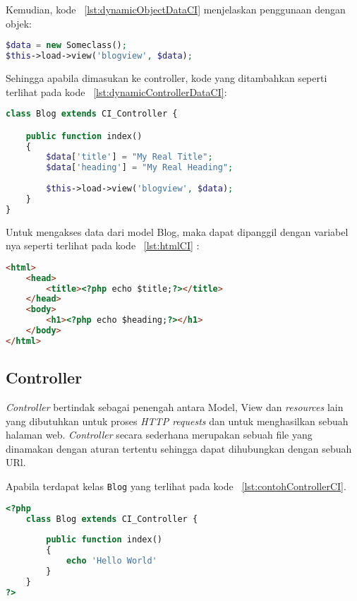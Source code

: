 \noindent Kemudian, kode ~\ref{lst:dynamicObjectDataCI} menjelaskan penggunaan dengan objek:
\begin{lstlisting}[style=customphp, language=PHP, basicstyle=\ttfamily, frame=single, columns=fullflexible, keepspaces=true, breaklines=true, showstringspaces=false, label={lst:dynamicObjectDataCI}, caption=Struktur data dinamis berbentuk objek.] 
$data = new Someclass();
$this->load->view('blogview', $data);
\end{lstlisting}

\noindent Sehingga apabila dimasukan ke controller, kode yang ditambahkan seperti terlihat pada kode ~\ref{lst:dynamicControllerDataCI}:
\begin{lstlisting}[style=customphp, language=PHP, basicstyle=\ttfamily, frame=single, columns=fullflexible, keepspaces=true, breaklines=true, showstringspaces=false, label={lst:dynamicControllerDataCI}, caption=Struktur data dinamis dalam controller.] 
class Blog extends CI_Controller {

	public function index()
	{
		$data['title'] = "My Real Title";
		$data['heading'] = "My Real Heading";
		
		$this->load->view('blogview', $data);
	}
}
\end{lstlisting}

\noindent Untuk mengakses data dari model Blog, maka dapat dipanggil dengan variabel nya seperti terlihat pada kode ~\ref{lst:htmlCI} :
\begin{lstlisting}[style=customhtml, language=HTML, basicstyle=\ttfamily, frame=single, columns=fullflexible, keepspaces=true, breaklines=true, showstringspaces=false, label={lst:htmlCI}, caption=Akses data dinamis dalam file HTML.] 
<html>
	<head>
		<title><?php echo $title;?></title>
	</head>
	<body>
		<h1><?php echo $heading;?></h1>
	</body>
</html>
\end{lstlisting}

\subsection{Controller}
\label{s:controllerCI}
\par \textit{Controller} bertindak sebagai penengah antara Model, View dan \textit{resources} lain yang dibutuhkan untuk proses \textit{HTTP requests} dan untuk menghasilkan sebuah halaman web. \textit{Controller} secara sederhana merupakan sebuah file yang dinamakan dengan aturan tertentu sehingga dapat dihubungkan dengan sebuah URl.

Apabila terdapat kelas \texttt{Blog} yang terlihat pada kode ~\ref{lst:contohControllerCI}.
\begin{lstlisting}[style=customphp, language=PHP, basicstyle=\ttfamily, frame=single, columns=fullflexible, keepspaces=true, breaklines=true, showstringspaces=false, label={lst:contohControllerCI}, caption=Contoh controller pada codeIgniter.] 
<?php
	class Blog extends CI_Controller {
	
		public function index()
		{
			echo 'Hello World'
		}
	}
?>
\end{lstlisting} 




